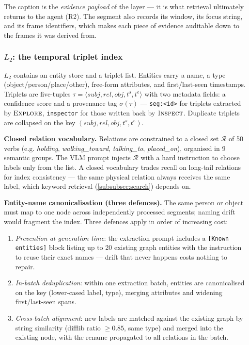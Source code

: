 The caption is the \emph{evidence payload} of the layer --- it is what retrieval ultimately returns to
the agent (R2). The segment also records its window, its focus string, and its frame identifiers,
which makes each piece of evidence auditable down to the frames it was derived from.

\subsubsection{$L_2$: the temporal triplet index}
\label{subsubsec:l2}

$L_2$ contains an entity store and a triplet list. Entities carry a name, a type
(object/person/place/other), free-form attributes, and first/last-seen timestamps. Triplets are
five-tuples $\tau = \langle \mathit{subj}, \mathit{rel}, \mathit{obj}, t^{s}, t^{e} \rangle$ with
two metadata fields: a confidence score and a provenance tag $\sigma(\tau)$ --- \texttt{seg:<id>} for
triplets extracted by $\textsc{Explore}$, \texttt{inspector} for those written back by
$\textsc{Inspect}$. Duplicate triplets are collapsed on the key
$(\mathit{subj}, \mathit{rel}, \mathit{obj}, t^{s}, t^{e})$.

\textbf{Closed relation vocabulary.} Relations are constrained to a closed set $\mathcal{R}$ of 50
verbs (e.g. \emph{holding}, \emph{walking\_toward}, \emph{talking\_to}, \emph{placed\_on}), organised in 9 semantic
groups. The VLM prompt injects $\mathcal{R}$ with a hard instruction to choose labels only from
the list. A closed vocabulary trades recall on long-tail relations for index consistency --- the
same physical relation always receives the same label, which keyword retrieval (\cref{subsubsec:search}) depends
on.

\textbf{Entity-name canonicalisation (three defences).} The same person or object must map to one node
across independently processed segments; naming drift would fragment the index. Three defences
apply in order of increasing cost:

\begin{enumerate}
  \item \emph{Prevention at generation time}: the extraction prompt includes a \texttt{[Known entities]} block
  listing up to 20 existing graph entities with the instruction to reuse their exact names ---
  drift that never happens costs nothing to repair.
  \item \emph{In-batch deduplication}: within one extraction batch, entities are canonicalised on the key
  (lower-cased label, type), merging attributes and widening first/last-seen spans.
  \item \emph{Cross-batch alignment}: new labels are matched against the existing graph by string
  similarity (difflib ratio $\geq 0.85$, same type) and merged into the existing node, with the
  rename propagated to all relations in the batch.
\end{enumerate}

